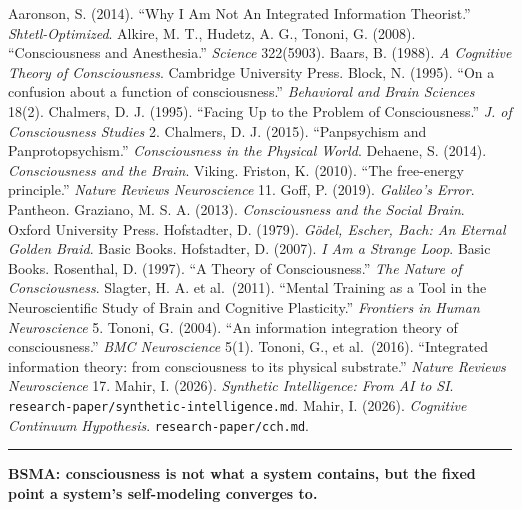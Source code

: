 \documentclass[
  11pt,
  a4paper,
]{article}
\begin{document}
Aaronson, S. (2014). ``Why I Am Not An Integrated Information
Theorist.'' \emph{Shtetl-Optimized}. Alkire, M. T., Hudetz, A. G.,
Tononi, G. (2008). ``Consciousness and Anesthesia.'' \emph{Science}
322(5903). Baars, B. (1988). \emph{A Cognitive Theory of Consciousness}.
Cambridge University Press. Block, N. (1995). ``On a confusion about a
function of consciousness.'' \emph{Behavioral and Brain Sciences} 18(2).
Chalmers, D. J. (1995). ``Facing Up to the Problem of Consciousness.''
\emph{J. of Consciousness Studies} 2. Chalmers, D. J. (2015).
``Panpsychism and Panprotopsychism.'' \emph{Consciousness in the
Physical World}. Dehaene, S. (2014). \emph{Consciousness and the Brain}.
Viking. Friston, K. (2010). ``The free-energy principle.'' \emph{Nature
Reviews Neuroscience} 11. Goff, P. (2019). \emph{Galileo's Error}.
Pantheon. Graziano, M. S. A. (2013). \emph{Consciousness and the Social
Brain}. Oxford University Press. Hofstadter, D. (1979). \emph{Gödel,
Escher, Bach: An Eternal Golden Braid}. Basic Books. Hofstadter, D.
(2007). \emph{I Am a Strange Loop}. Basic Books. Rosenthal, D. (1997).
``A Theory of Consciousness.'' \emph{The Nature of Consciousness}.
Slagter, H. A. et al.~(2011). ``Mental Training as a Tool in the
Neuroscientific Study of Brain and Cognitive Plasticity.''
\emph{Frontiers in Human Neuroscience} 5. Tononi, G. (2004). ``An
information integration theory of consciousness.'' \emph{BMC
Neuroscience} 5(1). Tononi, G., et al.~(2016). ``Integrated information
theory: from consciousness to its physical substrate.'' \emph{Nature
Reviews Neuroscience} 17. Mahir, I. (2026). \emph{Synthetic
Intelligence: From AI to SI}.
\texttt{research-paper/synthetic-intelligence.md}. Mahir, I. (2026).
\emph{Cognitive Continuum Hypothesis}. \texttt{research-paper/cch.md}.

\begin{center}\rule{0.5\linewidth}{0.5pt}\end{center}

\textbf{BSMA: consciousness is not what a system contains, but the fixed
point a system's self-modeling converges to.}
\end{document}
